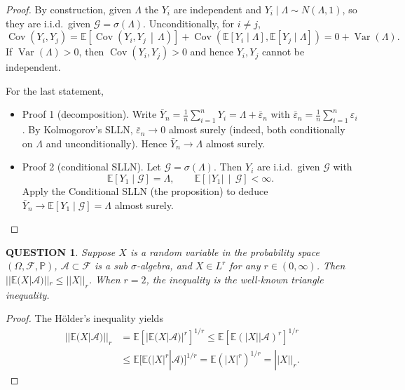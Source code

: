 \documentclass[12pt]{article}
\renewcommand{\(}{\left(}%
\renewcommand{\)}{\right)}%
\renewcommand{\[}{\left[}%
\renewcommand{\]}{\right]}%
\renewcommand{\a}{\mathscr{A}}
\newcommand{\p}{\mathbb{P}}
\newcommand{\f}{\mathscr{F}}
\newtheorem{question}{QUESTION}[section]}
\newtheorem{proof}{Proof.}}
\begin{document}
\begin{proof}
By construction, given $\Lambda$ the $Y_i$ are independent and $Y_i\mid\Lambda\sim N(\Lambda,1)$, so they are i.i.d.\ given $\mathcal G=\sigma(\Lambda)$.
Unconditionally, for $i\neq j$,
\begin{equation*}
\operatorname{Cov}(Y_i,Y_j)
=\mathbb E\left[\operatorname{Cov}(Y_i,Y_j\,\middle|\,\Lambda)\right]
+\operatorname{Cov}\!\left(\mathbb E[Y_i\mid\Lambda],\mathbb E[Y_j\mid\Lambda]\right)
=0+\operatorname{Var}(\Lambda).
\end{equation*}
If $\operatorname{Var}(\Lambda)>0$, then $\operatorname{Cov}(Y_i,Y_j)>0$ and hence $Y_i,Y_j$ cannot be independent.

For the last statement, 
\begin{itemize}
	\item Proof 1 (decomposition). Write $\bar Y_n=\frac{1}{n}\sum_{i=1}^n Y_i=\Lambda+\bar\varepsilon_n$ with $\bar\varepsilon_n=\frac{1}{n}\sum_{i=1}^n \varepsilon_i$.
By Kolmogorov's SLLN, $\bar\varepsilon_n\to 0$ almost surely (indeed, both conditionally on $\Lambda$ and unconditionally).
Hence $\bar Y_n\to \Lambda$ almost surely.
	\item Proof 2 (conditional SLLN). Let $\mathcal G=\sigma(\Lambda)$. Then $Y_i$ are i.i.d.\ given $\mathcal G$ with
\begin{equation*}
\mathbb E[Y_1\mid\mathcal G]=\Lambda,\qquad \mathbb E\left[\,|Y_1|\,\middle|\,\mathcal G\right]<\infty.
\end{equation*}
Apply the Conditional SLLN (the proposition) to deduce $\bar Y_n\to \mathbb E[Y_1\mid\mathcal G]=\Lambda$ almost surely.
\end{itemize}
\end{proof}

\begin{question}
	Suppose $X$ is a random variable in the probability space $(\Omega,\f,\p)$, $\a\subset \f$ is a sub $\sigma$-algebra, and $X\in L^r$ for any $r\in (0,\infty)$.  Then $||\mathbb{E} (X|\a)||_r\leq ||X||_r$. When $r=2$, the inequality is the well-known \emph{triangle inequality}.
\end{question}
\begin{proof}
	The H\"older's inequality yields
	\begin{equation*}
		\begin{split}
			||\mathbb{E} (X|\a)||_r&=\mathbb{E}[|\mathbb{E}(X|\a)|^r]^{1/r}\leq \mathbb{E}[\mathbb{E}(|X||\a)^r]^{1/r}\\
			&\leq \mathbb{E}[\mathbb{E}(|X|^r|\a)]^{1/r}=\mathbb E(|X|^r)^{1/r}=||X||_r.
		\end{split}
	\end{equation*}
\end{proof}
\end{document}
